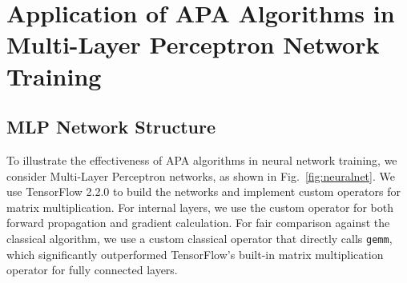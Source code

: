 \documentclass[manuscript]{acmart}
\newcommand{\dims}[1]{\langle #1 \rangle}
\newcommand{\RZ}[1]{\textcolor{purple}{\textbf{RZ}: #1}}
\begin{document}

\section{Application of APA Algorithms in Multi-Layer Perceptron Network Training}




\subsection{MLP Network Structure}

To illustrate the effectiveness of APA algorithms in neural network training, we consider Multi-Layer Perceptron networks, as shown in Fig.~\ref{fig:neuralnet}.
We use TensorFlow 2.2.0 to build the networks and implement custom operators for matrix multiplication.
For internal layers, we use the custom operator for both forward propagation and gradient calculation.
For fair comparison against the classical algorithm, we use a custom classical operator that directly calls \texttt{gemm}, which significantly outperformed TensorFlow's built-in matrix multiplication operator for fully connected layers.
\end{document}
